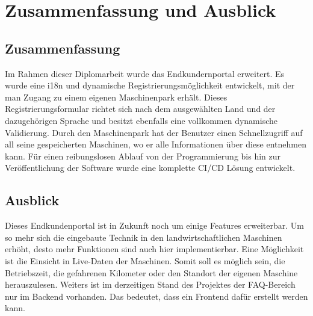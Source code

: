 \chapter{Zusammenfassung und Ausblick}
\section{Zusammenfassung}
Im Rahmen dieser Diplomarbeit wurde das Endkundernportal erweitert. Es wurde eine i18n und dynamische Registrierungsmöglichkeit entwickelt, mit der man Zugang zu einem eigenen Maschinenpark erhält. Dieses Registrierungsformular richtet sich nach dem ausgewählten Land und der dazugehörigen Sprache und besitzt ebenfalls eine vollkommen dynamische Validierung. Durch den Maschinenpark hat der Benutzer einen Schnellzugriff auf all seine gespeicherten Maschinen, wo er alle Informationen über diese entnehmen kann. Für einen reibungslosen Ablauf von der Programmierung bis hin zur Veröffentlichung der Software wurde eine komplette CI/CD Lösung entwickelt.

\section{Ausblick}
Dieses Endkundenportal ist in Zukunft noch um einige Features erweiterbar. Um so mehr sich die eingebaute Technik in den landwirtschaftlichen Maschinen erhöht, desto mehr Funktionen sind auch hier implementierbar. Eine Möglichkeit ist die Einsicht in Live-Daten der Maschinen. Somit soll es möglich sein, die Betriebszeit, die gefahrenen Kilometer oder den Standort der eigenen Maschine herauszulesen. Weiters ist im derzeitigen Stand des Projektes der FAQ-Bereich nur im Backend vorhanden. Das bedeutet, dass ein Frontend dafür erstellt werden kann.
